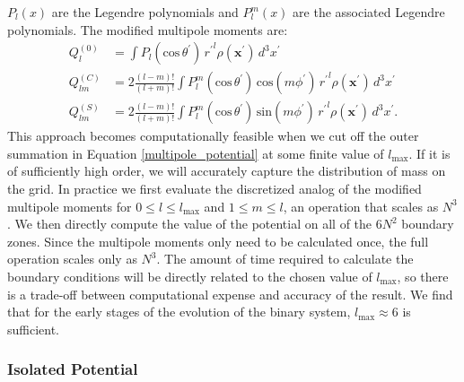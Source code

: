 \documentclass[12pt,preprint]{aastex}
\begin{document}
$P_l(x)$ are the Legendre polynomials and $P_{l}^{m}(x)$ are the associated Legendre polynomials. The modified multipole moments are:
\begin{align}
  Q_l^{(0)}   &= \int P_l(\text{cos}\, \theta^\prime)\, {r^{\prime}}^l \rho(\mathbf{x}^\prime)\, d^3 x^\prime \\
  Q_{lm}^{(C)} &= 2\frac{(l-m)!}{(l+m)!} \int P_{l}^{m}(\text{cos}\, \theta^\prime)\, \text{cos}(m\phi^\prime)\, {r^\prime}^l \rho(\mathbf{x}^\prime)\, d^3 x^\prime \\
  Q_{lm}^{(S)} &= 2\frac{(l-m)!}{(l+m)!} \int P_{l}^{m}(\text{cos}\, \theta^\prime)\, \text{sin}(m\phi^\prime)\, {r^\prime}^l \rho(\mathbf{x}^\prime)\, d^3 x^\prime.
\end{align}
This approach becomes computationally feasible when we cut off the outer summation in Equation \ref{multipole_potential} at some finite value of $l_{\text{max}}$. If it is of sufficiently high order, we will accurately capture the distribution of mass on the grid. In practice we first evaluate the discretized analog of the modified multipole moments for $0 \leq l \leq l_{\text{max}}$ and $1 \leq m \leq l$, an operation that scales as $N^3$. We then directly compute the value of the potential on all of the $6N^2$ boundary zones. Since the multipole moments only need to be calculated once, the full operation scales only as $N^3$. The amount of time required to calculate the boundary conditions will be directly related to the chosen value of $l_{\text{max}}$, so there is a trade-off between computational expense and accuracy of the result. We find that for the early stages of the evolution of the binary system, $l_\text{max} \approx 6$ is sufficient.

\subsubsection{Isolated Potential}
\end{document}
